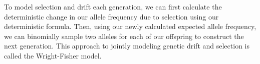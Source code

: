 {%


 To model selection and drift each generation, we can first calculate the deterministic change in our
allele frequency due to selection using our deterministic formula.  Then, using our newly calculated expected allele frequency, we can binomially sample two alleles for each of our offspring to construct the next generation. This approach to jointly modeling genetic drift and selection is called the Wright-Fisher model. 

}
